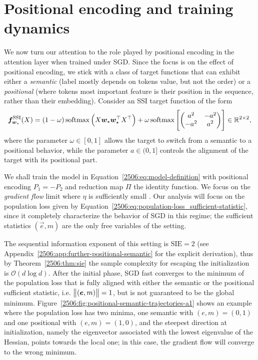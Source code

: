 \section{Positional encoding and training dynamics} \label{2506:sec:positional_encoding}
We now turn our attention to the role played by positional encoding in the attention layer when trained under SGD. Since the focus is on the effect of positional encoding, we stick with a class of target functions that can exhibit either a \emph{semantic} (label mostly depends on tokens value, but not the order) or a \emph{positional} (where tokens most important feature is their position in the sequence, rather than their embedding). Consider an SSI target function of the form
\begin{equation} \label{2506:eq:positional-semantic-label}
    {\boldsymbol{f}}^\mathrm{SSI}_{{\boldsymbol{w}}_{\star}}(X) = (1-\omega) \operatorname{softmax}\left(X{\boldsymbol{w}}_\star {\boldsymbol{w}}_\star^\top X^\top\right) + \omega \operatorname{softmax}\left[\begin{pmatrix}
        a^2 & -a^2 \\
        -a^2 & a^2 \\
    \end{pmatrix}\right]
    \in \mathbb{R}^{2\times 2},
\end{equation}
where the parameter $\omega\in[0,1]$ allows the target to switch from a semantic to a positional behavior, while the parameter $a\in(0,1]$ controls the alignment of the target with its positional part.

We shall train the model in Equation~\eqref{2506:eq:model-definition} with positional encoding
\(P_1 = -P_2\)
and reduction map \(\Pi\) the identity function. We focus on the \emph{gradient flow} limit where $\eta$ is sufficiently small \citep{chung1954stochastic}. Our analysis will focus on the population loss given by Equation~\eqref{2506:eq:population-loss_sufficient-statistic}, since it completely characterize the behavior of SGD in this regime; the sufficient statistics \((\vec{e},m)\) are the only free variables of the setting.

The sequential information exponent of this setting is \(\mathrm{SIE}=2\) (see Appendix~\ref{2506:app:further-positional-semantic} for the explicit derivation), thus by Theorem~\ref{2506:thm:sie} the sample complexity for escaping the initialization is \(\mathcal{O}(d \log d)\).
After the initial phase, SGD fast converges to the minimum of the population loss that is fully aligned with either the semantic or the positional sufficient statistic, i.e. \(\left\lVert ({\boldsymbol{e}},m)\right\rVert = 1\), but is not guaranteed to be the global minimum. 
Figure~\ref{2506:fig:positional-semantic-trajectories-a1} shows an example where the population loss has two minima, one semantic with \((e,m)=(0,1)\) and one positional with \((e,m)=(1,0)\), and the steepest direction at initialization, namely the eigenvector associated with the lowest eigenvalue of the Hessian, points towards the local one; in this case, the gradient flow will converge to the wrong minimum.

